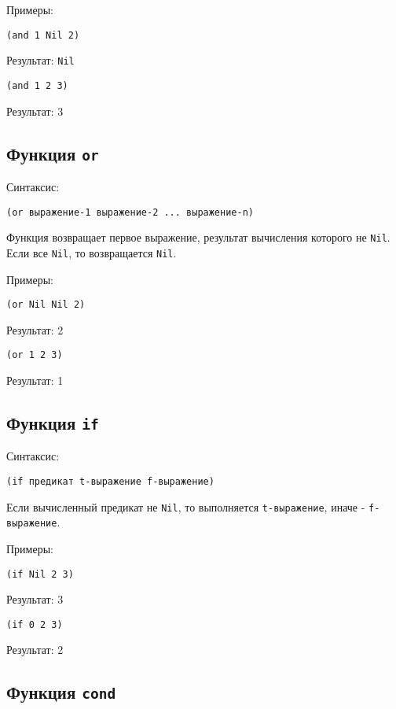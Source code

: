Примеры:

\begin{lstlisting}
(and 1 Nil 2)
\end{lstlisting}
Результат: \texttt{Nil}

\begin{lstlisting}
(and 1 2 3)
\end{lstlisting}
Результат: 3

\subsection{Функция \texttt{or}}

Синтаксис:
\begin{lstlisting}
(or выражение-1 выражение-2 ... выражение-n)
\end{lstlisting}

Функция возвращает первое выражение, результат вычисления которого не \texttt{Nil}. Если все \texttt{Nil}, то возвращается \texttt{Nil}.

Примеры:

\begin{lstlisting}
(or Nil Nil 2)
\end{lstlisting}
Результат: 2

\begin{lstlisting}
(or 1 2 3)
\end{lstlisting}
Результат: 1

\subsection{Функция \texttt{if}}

Синтаксис:
\begin{lstlisting}
(if предикат t-выражение f-выражение)
\end{lstlisting}

Если вычисленный предикат не \texttt{Nil}, то выполняется \texttt{t-выражение}, иначе - \texttt{f-выражение}.

Примеры:

\begin{lstlisting}
(if Nil 2 3)
\end{lstlisting}
Результат: 3

\begin{lstlisting}
(if 0 2 3)
\end{lstlisting}
Результат: 2

\subsection{Функция \texttt{cond}}

